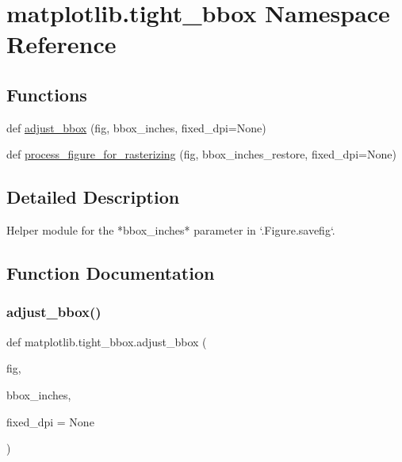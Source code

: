 \hypertarget{namespacematplotlib_1_1tight__bbox}{}\section{matplotlib.\+tight\+\_\+bbox Namespace Reference}
\label{namespacematplotlib_1_1tight__bbox}
\subsection*{Functions}
\begin{DoxyCompactItemize}
\item 
def \hyperlink{namespacematplotlib_1_1tight__bbox_ae91a4eb1dc5433c8e2a424bc5d0ceb6e}{adjust\+\_\+bbox} (fig, bbox\+\_\+inches, fixed\+\_\+dpi=None)
\item 
def \hyperlink{namespacematplotlib_1_1tight__bbox_aa7e1c204edc0c9be0236568e0c8f9f5c}{process\+\_\+figure\+\_\+for\+\_\+rasterizing} (fig, bbox\+\_\+inches\+\_\+restore, fixed\+\_\+dpi=None)
\end{DoxyCompactItemize}


\subsection{Detailed Description}
\begin{DoxyVerb}Helper module for the *bbox_inches* parameter in `.Figure.savefig`.
\end{DoxyVerb}
 

\subsection{Function Documentation}
\mbox{\label{namespacematplotlib_1_1tight__bbox_ae91a4eb1dc5433c8e2a424bc5d0ceb6e}} 
\subsubsection{\texorpdfstring{adjust\+\_\+bbox()}{adjust\_bbox()}}
{\footnotesize\ttfamily def matplotlib.\+tight\+\_\+bbox.\+adjust\+\_\+bbox (\begin{DoxyParamCaption}\item[{}]{fig,  }\item[{}]{bbox\+\_\+inches,  }\item[{}]{fixed\+\_\+dpi = {\ttfamily None} }\end{DoxyParamCaption})}

